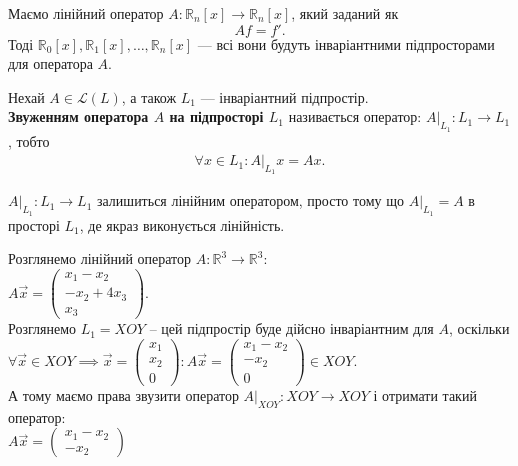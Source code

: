 \documentclass{math_library}
\begin{document}
\begin{example}
Маємо лінійний оператор $A \colon \mathbb{R}_n[x] \to \mathbb{R}_n[x]$, який заданий як 
\[
Af = f'.
\]
Тоді $\mathbb{R}_0[x], \mathbb{R}_1[x],\dots,\mathbb{R}_n[x]$ --- всі вони будуть інваріантними підпросторами для оператора $A$.
\end{example}

\begin{definition}
Нехай $A \in \mathcal{L}(L)$, а також $L_1$ --- інваріантний підпростір.\\
\textbf{Звуженням оператора $A$ на підпросторі $L_1$} називається оператор: $A |_{L_1} \colon L_1 \to L_1$, тобто
\begin{align*}
\forall x \in L_1: A |_{L_1}x = Ax.
\end{align*}
\end{definition}

\begin{remark}
$A|_{L_1} \colon L_1 \to L_1$ залишиться лінійним оператором, просто тому що $A|_{L_1} = A$ в просторі $L_1$, де якраз виконується лінійність.
\end{remark}

\iffalse
\begin{example}
Розглянемо лінійний оператор $A \colon \mathbb{R}^3 \to \mathbb{R}^3$:\\
$A \vec{x} = \begin{pmatrix}
x_1 - x_2 \\ -x_2 + 4x_3 \\ x_3
\end{pmatrix}$.\\
Розглянемо $L_1 = XOY$ -- цей підпростір буде дійсно інваріантним для $A$, оскільки\\
$\forall \vec{x} \in XOY \implies \vec{x} = \begin{pmatrix}
x_1 \\ x_2 \\ 0
\end{pmatrix}: A \vec{x} = \begin{pmatrix}
x_1 - x_2 \\ -x_2 \\ 0
\end{pmatrix} \in XOY$.\\
А тому маємо права звузити оператор $A|_{XOY}: XOY \to XOY$ і отримати такий оператор:\\
$A \vec{x} = \begin{pmatrix}
x_1 - x_2 \\ -x_2
\end{pmatrix}$
\end{example}
\end{document}
